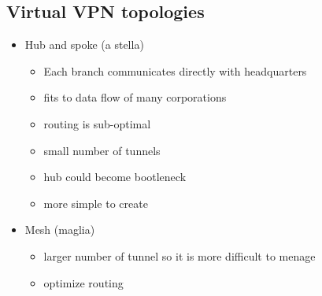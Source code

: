 \documentclass{article}
\begin{document}
\subsection{Virtual VPN topologies}
\begin{itemize}
    \item Hub and spoke (a stella)
    \begin{itemize}
        \item Each branch communicates directly with headquarters
        \item fits to data flow of many corporations
        \item routing is sub-optimal
        \item small number of tunnels
        \item hub could become bootleneck
        \item more simple to create
    \end{itemize}
    \item Mesh (maglia)
    \begin{itemize}
        \item larger number of tunnel so it is more difficult to menage
        \item optimize routing
    \end{itemize}
\end{itemize}
\end{document}
